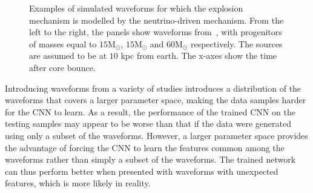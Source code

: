 \documentclass[aps,twocolumn,showpacs,groupedaddress, nofootinbib]{revtex4}  %
\begin{document}
%
%
\begin{figure}
     \begin{center}
        \quad
        \quad
    \end{center}
    \caption{Examples of simulated waveforms for which the explosion mechanism is
modelled by the neutrino-driven mechanism. From the left to the right, the
panels show waveforms from~\cite{10.1093mnrasstz990, 
radice2019characterizing, yakunin2017gravitational}, with progenitors of masses equal to
$15\text{M}_\odot$, $15\text{M}_\odot$ and $60\text{M}_\odot$ respectively.
The sources are assumed to be at $10$ kpc from earth. The x-axes show the time after core bounce.
\label{fig:neuwaveforms}} 
\end{figure}
%
%
Introducing waveforms from a variety of studies introduces a distribution of
the waveforms that covers a larger parameter space, making the data samples
harder for the \ac{CNN} to learn. As a result, the performance of the trained
\ac{CNN} on the testing samples may appear to be worse than that if the data
were generated using only a subset of the waveforms. However, a larger
parameter space provides the advantage of forcing the \ac{CNN} to learn the
features common among the waveforms rather than simply a subset of the
waveforms.  The trained network can thus perform better when presented with
waveforms with unexpected features, which is more likely in reality.
\end{document}

